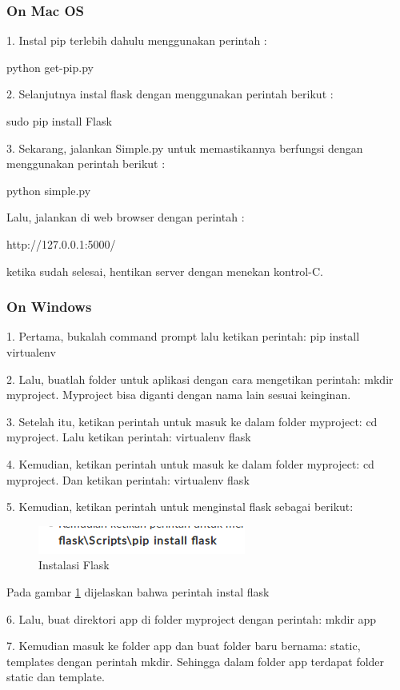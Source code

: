 \documentclass[12pt,a4paper]{article}
\begin{document}
\subsubsection{On Mac OS}
1. Instal pip terlebih dahulu menggunakan perintah :

	python get-pip.py

2. Selanjutnya instal flask dengan menggunakan perintah berikut :

	sudo pip install Flask

3. Sekarang, jalankan Simple.py untuk memastikannya berfungsi dengan menggunakan perintah berikut :

	python simple.py

Lalu, jalankan di web browser dengan perintah :

http://127.0.0.1:5000/

ketika sudah selesai, hentikan server dengan menekan kontrol-C.
\subsubsection{On Windows}

1.	Pertama, bukalah command prompt lalu ketikan perintah: pip install virtualenv

2.	Lalu, buatlah folder untuk aplikasi dengan cara mengetikan perintah: mkdir myproject.
Myproject bisa diganti dengan nama lain sesuai keinginan.

3.	Setelah itu, ketikan perintah untuk masuk ke dalam folder myproject: cd myproject. Lalu ketikan perintah: virtualenv flask

4.	Kemudian, ketikan perintah untuk masuk ke dalam folder myproject: cd myproject. Dan ketikan perintah: virtualenv flask

5.	Kemudian, ketikan perintah untuk menginstal flask sebagai berikut:
\begin{figure}[ht]
\centerline{\includegraphics[scale=1]{../figures/3instal.png} }

\caption{Instalasi Flask} 
\label{Flask}
\end{figure}

Pada gambar \ref{Flask} dijelaskan bahwa perintah instal flask

6.	Lalu, buat direktori app di folder myproject dengan perintah: mkdir app

7.	Kemudian masuk ke folder app dan buat folder baru bernama: static, templates dengan perintah mkdir. Sehingga dalam folder app terdapat folder static dan template.
\end{document}
